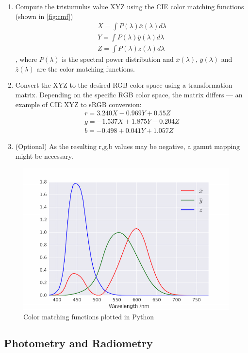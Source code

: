 \begin{enumerate}
	\item Compute the tristumulus value XYZ using the CIE color matching functions (shown in \autoref{fig:cmf})
	\begin{align*} 
	X=\int P(\lambda)\overline{x}(\lambda)d\lambda\\
	Y=\int P(\lambda)\overline{y}(\lambda)d\lambda\\
	Z=\int P(\lambda)\overline{z}(\lambda)d\lambda
	\end{align*} 
	, where $P(\lambda)$ is the spectral power distribution and $\overline{x}(\lambda)$, $\overline{y}(\lambda)$ and $\overline{z}(\lambda)$ are the color matching functions.
	\item Convert the XYZ to the desired RGB color space using a transformation matrix. Depending on the specific RGB color space, the matrix differs --- an example of CIE XYZ to sRGB conversion:
	\begin{align*}
	r=3.240X-0.969Y+0.55Z\\
	g=-1.537X+1.875Y-0.204Z\\
	b=-0.498+0.041Y+1.057Z
	\end{align*}
	\item (Optional) As the resulting r,g,b values may be negative, a gamut mapping might be necessary.
\end{enumerate}

\begin{figure}[httpb]
	\centering
	\includegraphics[width=.8\linewidth]{img/cmf.png}
	\caption[CMF]{Color matching functions plotted in Python\footnotemark}
	\label{fig:cmf}
\end{figure}

\subsection{Photometry and Radiometry}

